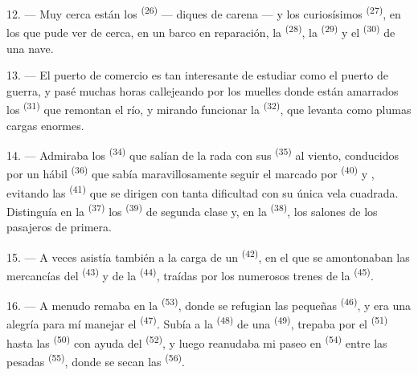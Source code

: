 12. --- Muy cerca están los  \textsuperscript{(26)} --- diques de
carena --- y los curiosísimos  \textsuperscript{(27)}, en
los que pude ver de cerca, en un barco en reparación, la 
\textsuperscript{(28)}, la  \textsuperscript{(29)} y el 
\textsuperscript{(30)} de una nave.

13. --- El puerto de comercio es tan interesante de estudiar como el
puerto de guerra, y pasé muchas horas callejeando por los muelles donde
están amarrados los  \textsuperscript{(31)} que remontan el
río, y mirando funcionar la  \textsuperscript{(32)}, que
levanta como plumas cargas enormes.

\VUsaut{4.0mm}
\VUsaut{3.0mm}

14. --- Admiraba los  \textsuperscript{(34)} que salían de la
rada con sus  \textsuperscript{(35)} al viento, conducidos por un
hábil  \textsuperscript{(36)} que sabía maravillosamente seguir el
 marcado por  \textsuperscript{(40)} y ,
evitando las  \textsuperscript{(41)} que se dirigen con tanta
dificultad con su única vela cuadrada. Distinguía en la 
\textsuperscript{(37)} los  \textsuperscript{(39)} de segunda clase y, en la
 \textsuperscript{(38)}, los salones de los pasajeros de primera.

15. --- A veces asistía también a la carga de un 
\textsuperscript{(42)}, en el que se amontonaban las mercancías del
 \textsuperscript{(43)} y de la 
\textsuperscript{(44)}, traídas por los numerosos trenes de la  \textsuperscript{(45)}.

\VUsaut{3.0mm}
\VUsaut{3.0mm}

16. --- A menudo remaba en la  \textsuperscript{(53)}, donde
se refugian las pequeñas  \textsuperscript{(46)}, y era una
alegría para mí manejar el  \textsuperscript{(47)}. Subía a la
 \textsuperscript{(48)} de una  \textsuperscript{(49)},
trepaba por el  \textsuperscript{(51)} hasta las 
\textsuperscript{(50)} con ayuda del  \textsuperscript{(52)}, y luego
reanudaba mi paseo en  \textsuperscript{(54)} entre las pesadas
 \textsuperscript{(55)}, donde se secan las 
\textsuperscript{(56)}.

